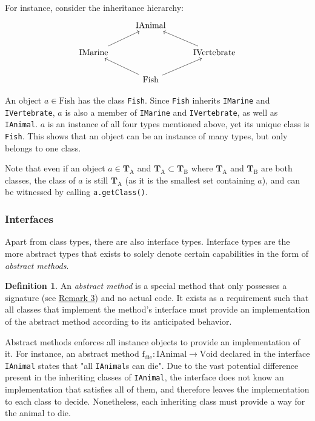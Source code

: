 \documentclass[12pt]{article}
\theoremstyle{definition}
\newtheorem{defn}{Definition}[section]
\newcommand{\code}[1]{\colorbox{codegray}{\texttt{#1}}}
\newcommand{\ttype}[1]{\text{#1}}
\newcommand{\gtype}[1]{\textbf{T}_\text{#1}}
\begin{document}
	For instance, consider the inheritance hierarchy:
	\begin{equation*}\begin{tikzcd}
		& \ttype{IAnimal}\\
		\ttype{IMarine} \ar[ru] && \ttype{IVertebrate} \ar[lu] \\
		& \ttype{Fish} \ar[lu] \ar[ru]
	\end{tikzcd}\end{equation*}
	
	An object $a \in \ttype{Fish}$ has the class \code{Fish}. Since \code{Fish} inherits \code{IMarine} and \code{IVertebrate}, $a$ is also a member of \code{IMarine} and \code{IVertebrate}, as well as \code{IAnimal}. $a$ is an instance of all four types mentioned above, yet its unique class is \code{Fish}. This shows that an object can be an instance of many types, but only belongs to one class.
	
	Note that even if an object $a \in \gtype{A}$ and $\gtype{A} \subset \gtype{B}$ where $\gtype{A}$ and $\gtype{B}$ are both classes, the class of $a$ is still $\gtype{A}$ (as it is the smallest set containing $a$), and can be witnessed by calling \code{a.getClass()}.
	
	\subsubsection{Interfaces}
	
	Apart from class types, there are also interface types. Interface types are the more abstract types that exists to solely denote certain capabilities in the form of \emph{abstract methods}.
	
	\begin{defn}
		An \emph{abstract method} is a special method that only possesses a signature (see \hyperref[sec:signature]{Remark 3}) and no actual code. It exists as a requirement such that all classes that implement the method's interface must provide an implementation of the abstract method according to its anticipated behavior.
	\end{defn}
	
	Abstract methods enforces all instance objects to provide an implementation of it. For instance, an abstract method $\text{f}_\text{die}	: \ttype{IAnimal} \to \ttype{Void}$ declared in the interface \code{IAnimal} states that "all \code{IAnimal}s can die". Due to the vast potential difference present in the inheriting classes of \code{IAnimal}, the interface does not know an implementation that satisfies all of them, and therefore leaves the implementation to each class to decide. Nonetheless, each inheriting class must provide a way for the animal to die.
	
\end{document}

